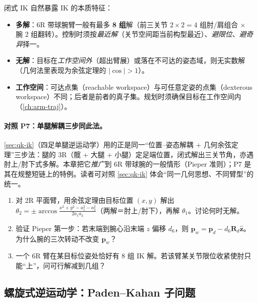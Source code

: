 \begin{note}[多解、无解与工作空间]\label{note:ak-ik-multisol}
闭式 IK 自然暴露 IK 的本质特征\cite{spong2006robot}：
\begin{itemize}
  \item \textbf{多解}：6R 带球腕臂一般有最多 \textbf{8 组}解（前三关节 $2\times2=4$ 组肘/肩组合 $\times$ 腕 2 组翻转）。控制时须按\emph{最近解}（关节空间距当前构型最近）、\emph{避限位}、\emph{避奇异}择一。
  \item \textbf{无解}：目标在\emph{工作空间外}（超出臂展）或落在不可达的姿态域，则无实数解（几何法里表现为余弦定理的 $|\cos|>1$）。
  \item \textbf{工作空间}：可达点集（reachable workspace）与可任意定姿的点集（dexterous workspace）不同；后者是前者的真子集。规划时须确保目标在工作空间内（\cref{ch:arm-traj}）。
\end{itemize}
\end{note}

\paragraph{对照 P7：单腿解耦三步同此法。}
\cref{sec:qk-ik}（四足单腿逆运动学）用的正是同一“位置--姿态解耦 + 几何余弦定理”三步法：腿的 3R（髋 + 大腿 + 小腿）定足端位置，闭式解出三关节角，亦遇肘上/肘下式多解。本章把它\emph{推广}到 6R 带球腕的一般情形（Pieper 准则）；P7 是其在规整短链上的特例。读者可对照 \cref{sec:qk-ik} 体会“同一几何思想、不同臂型”的统一。

\begin{practice}
\begin{enumerate}
  \item 对 2R 平面臂，用余弦定理由目标位置 $(x,y)$ 解出 $\theta_2=\pm\arccos\frac{x^2+y^2-a_1^2-a_2^2}{2a_1a_2}$（两解＝肘上/肘下），再解 $\theta_1$。讨论何时无解。
  \item 验证 Pieper 第一步：若末端到腕心沿末端 $z$ 偏移 $d_6$，则 $\mathbf{p}_w=\mathbf{p}_d-d_6\mathbf{R}_d\hat{\mathbf{z}}$。为什么腕的三次转动不改变 $\mathbf{p}_w$？
  \item 一个 6R 臂在某目标位姿处恰好有 8 组 IK 解。若该臂某关节限位收紧使肘只能“上”，问可行解减到几组？
\end{enumerate}
\end{practice}

\subsection{螺旋式逆运动学：Paden--Kahan 子问题}
\label{sec:ak-ik-paden-kahan}

